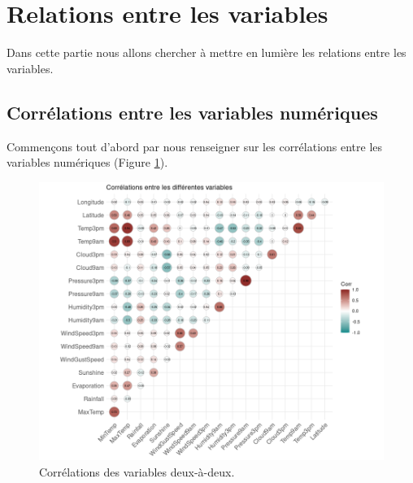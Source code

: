 \documentclass{article}
\begin{document}
\section{Relations entre les variables}

Dans cette partie nous allons chercher à mettre en lumière les relations entre les variables.

\subsection{Corrélations entre les variables numériques}

Commençons tout d'abord par nous renseigner sur les corrélations entre les variables numériques (Figure \ref{fig:correlations}). 

\begin{figure}[htp]
    \centering
    \includegraphics[width=\textwidth]{Images/correlations_variables.png}
    \caption{Corrélations des variables deux-à-deux.}
    \label{fig:correlations}
\end{figure}
\end{document}
